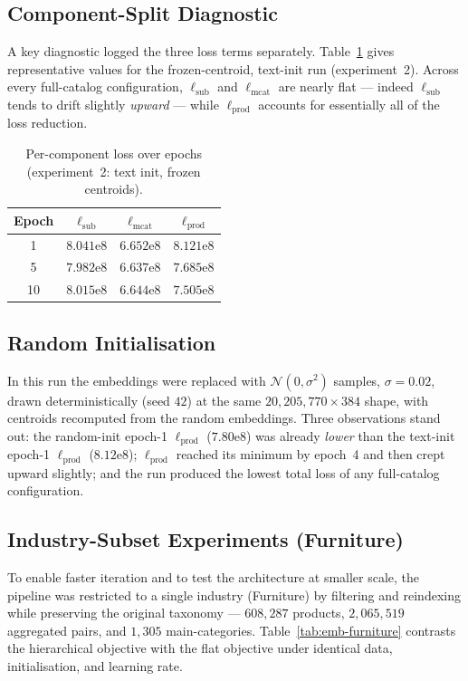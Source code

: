 \subsection{Component-Split Diagnostic}
A key diagnostic logged the three loss terms separately.
Table~\ref{tab:emb-split} gives representative values for the frozen-centroid,
text-init run (experiment~2). Across every full-catalog configuration,
$\ell_{\text{sub}}$ and $\ell_{\text{mcat}}$ are nearly flat --- indeed
$\ell_{\text{sub}}$ tends to drift slightly \emph{upward} --- while
$\ell_{\text{prod}}$ accounts for essentially all of the loss reduction.

\begin{table}[ht]
  \centering
  \caption{Per-component loss over epochs (experiment~2: text init, frozen
           centroids).}
  \label{tab:emb-split}
  \begin{tabular}{cccc}
    \toprule
    Epoch & $\ell_{\text{sub}}$ & $\ell_{\text{mcat}}$ & $\ell_{\text{prod}}$ \\
    \midrule
    1  & $8.041\mathrm{e}{8}$ & $6.652\mathrm{e}{8}$ & $8.121\mathrm{e}{8}$ \\
    5  & $7.982\mathrm{e}{8}$ & $6.637\mathrm{e}{8}$ & $7.685\mathrm{e}{8}$ \\
    10 & $8.015\mathrm{e}{8}$ & $6.644\mathrm{e}{8}$ & $7.505\mathrm{e}{8}$ \\
    \bottomrule
  \end{tabular}
\end{table}

\subsection{Random Initialisation}
In this run the embeddings were replaced with $\mathcal{N}(0,\sigma^2)$ samples,
$\sigma=0.02$, drawn deterministically (seed $42$) at the same
$20{,}205{,}770\times 384$ shape, with centroids recomputed from the random
embeddings. Three observations stand out: the random-init epoch-1
$\ell_{\text{prod}}$ ($7.80\mathrm{e}{8}$) was already \emph{lower} than the
text-init epoch-1 $\ell_{\text{prod}}$ ($8.12\mathrm{e}{8}$);
$\ell_{\text{prod}}$ reached its minimum by epoch~4 and then crept upward
slightly; and the run produced the lowest total loss of any full-catalog
configuration.

\subsection{Industry-Subset Experiments (Furniture)}
To enable faster iteration and to test the architecture at smaller scale, the
pipeline was restricted to a single industry (Furniture) by filtering and
reindexing while preserving the original taxonomy --- $608{,}287$ products,
$2{,}065{,}519$ aggregated pairs, and $1{,}305$ main-categories.
Table~\ref{tab:emb-furniture} contrasts the hierarchical objective with the
flat objective under identical data, initialisation, and learning rate.

